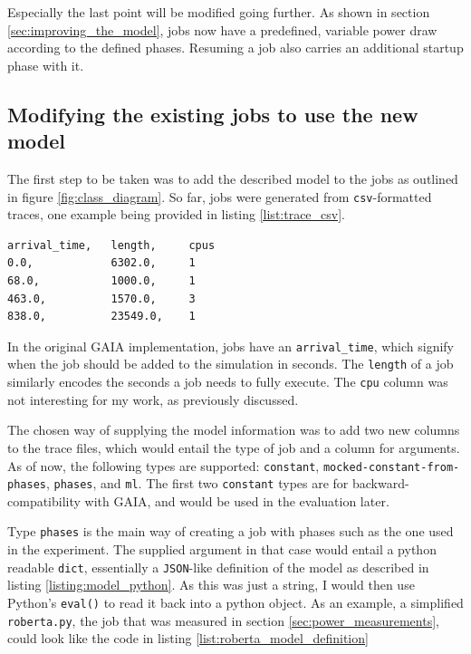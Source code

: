 Especially the last point will be modified going further. As shown in section \ref{sec:improving_the_model}, jobs now have a predefined, variable power draw according to the defined phases. Resuming a job also carries an additional startup phase with it.

\subsection{Modifying the existing jobs to use the new model}

The first step to be taken was to add the described model to the jobs as outlined in figure \ref{fig:class_diagram}. 
So far, jobs were generated from \verb|csv|-formatted traces, one example being provided in listing \ref{list:trace_csv}.

\begin{lstlisting}[frame=single, numbers=none, caption={Excerpt from the Alibaba-PAI trace}, label={list:trace_csv}, basicstyle=\ttfamily]
arrival_time,   length,     cpus
0.0,            6302.0,     1
68.0,           1000.0,     1
463.0,          1570.0,     3
838.0,          23549.0,    1
\end{lstlisting}

In the original GAIA implementation, jobs have an \verb|arrival_time|, which signify when the job should be added to the simulation in seconds. 
The \verb|length| of a job similarly encodes the seconds a job needs to fully execute. The \verb|cpu| column was not interesting for my work, as previously discussed.

The chosen way of supplying the model information was to add two new columns to the trace files, which would entail the type of job and a column for arguments. 
As of now, the following types are supported: \verb|constant|, \verb|mocked-constant-from-phases|, \verb|phases|, and \verb|ml|. 
The first two \verb|constant| types are for backward-compatibility with GAIA, and would be used in the evaluation later. 

Type \verb|phases| is the main way of creating a job with phases such as the one used in the experiment. The supplied argument in that case would entail a python readable \verb|dict|, essentially a \verb|JSON|-like definition of the model as described in listing \ref{listing:model_python}.
As this was just a string, I would then use Python's \verb|eval()| to read it back into a python object.
As an example, a simplified \verb|roberta.py|, the job that was measured in section \ref{sec:power_measurements}, could look like the code in listing \ref{list:roberta_model_definition}

